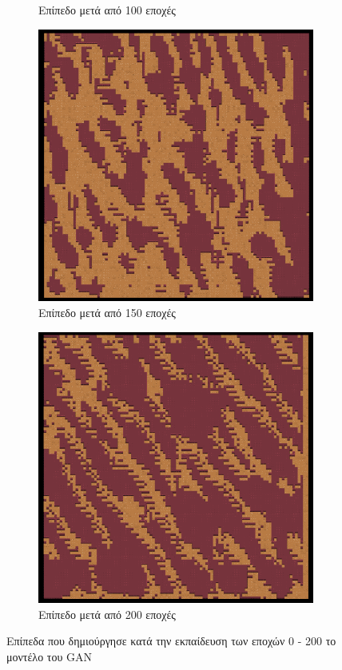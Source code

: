 \begin{figure}[H]
\begin{subfigure}{.5\textwidth}
  \caption{Επίπεδο μετά από 100 εποχές}
  \label{fig:sfig2}
\end{subfigure}
\begin{subfigure}{.5\textwidth}
  \centering
  \includegraphics[width=.8\linewidth]{../images/generated/150.png}
  \caption{Επίπεδο μετά από 150 εποχές}
  \label{fig:sfig2}
\end{subfigure}
\begin{subfigure}{.5\textwidth}
  \centering
  \includegraphics[width=.8\linewidth]{../images/generated/200.png}
  \caption{Επίπεδο μετά από 200 εποχές}
  \label{fig:sfig2}
\end{subfigure}
\caption{Επίπεδα που δημιούργησε κατά την εκπαίδευση των εποχών 0 - 200 το μοντέλο του GAN}
\label{fig:fig}
\end{figure}

